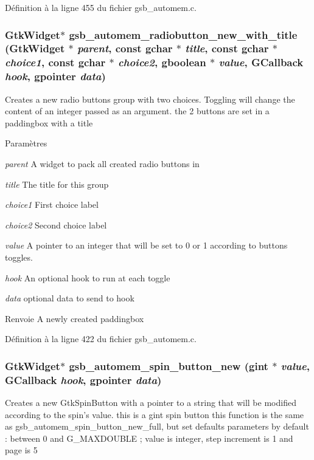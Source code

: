 Définition à la ligne 455 du fichier gsb\_\-automem.c.

\subsubsection[{gsb\_\-automem\_\-radiobutton\_\-new\_\-with\_\-title}]{\setlength{\rightskip}{0pt plus 5cm}GtkWidget$\ast$ gsb\_\-automem\_\-radiobutton\_\-new\_\-with\_\-title (GtkWidget $\ast$ {\em parent}, \/  const gchar $\ast$ {\em title}, \/  const gchar $\ast$ {\em choice1}, \/  const gchar $\ast$ {\em choice2}, \/  gboolean $\ast$ {\em value}, \/  GCallback {\em hook}, \/  gpointer {\em data})}\label{gsb__automem_8h_ade82b8b0e27c163fd3276dacfa6cf9fb}
Creates a new radio buttons group with two choices. Toggling will change the content of an integer passed as an argument. the 2 buttons are set in a paddingbox with a title


\begin{DoxyParams}{Paramètres}
\item[{\em parent}]A widget to pack all created radio buttons in \item[{\em title}]The title for this group \item[{\em choice1}]First choice label \item[{\em choice2}]Second choice label \item[{\em value}]A pointer to an integer that will be set to 0 or 1 according to buttons toggles. \item[{\em hook}]An optional hook to run at each toggle \item[{\em data}]optional data to send to hook\end{DoxyParams}
\begin{DoxyReturn}{Renvoie}
A newly created paddingbox 
\end{DoxyReturn}


Définition à la ligne 422 du fichier gsb\_\-automem.c.

\subsubsection[{gsb\_\-automem\_\-spin\_\-button\_\-new}]{\setlength{\rightskip}{0pt plus 5cm}GtkWidget$\ast$ gsb\_\-automem\_\-spin\_\-button\_\-new (gint $\ast$ {\em value}, \/  GCallback {\em hook}, \/  gpointer {\em data})}\label{gsb__automem_8h_a1618f5cf86220d6e15f84ac3f94e5382}
Creates a new GtkSpinButton with a pointer to a string that will be modified according to the spin's value. this is a gint spin button this function is the same as gsb\_\-automem\_\-spin\_\-button\_\-new\_\-full, but set defaults parameters by default : between 0 and G\_\-MAXDOUBLE ; value is integer, step increment is 1 and page is 5


